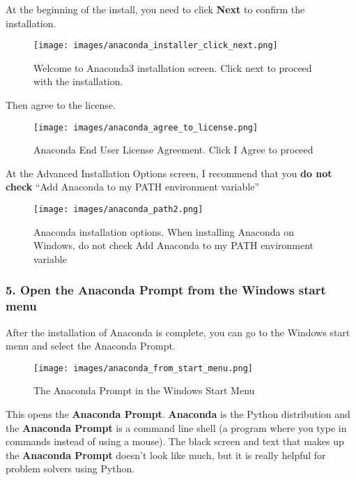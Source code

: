 \documentclass{book}
\makeatletter
\def\maxwidth{\ifdim\Gin@nat@width>\linewidth\linewidth
\else\Gin@nat@width\fi}
\let\Oldincludegraphics\includegraphics
\renewcommand{\includegraphics}[1]{\Oldincludegraphics[width=.8\maxwidth]{#1}}
\makeatother
\begin{document}
At the beginning of the install, you need to click \textbf{Next} to
confirm the installation.

\begin{figure}
\centering
\texttt{[image: images/anaconda\_installer\_click\_next.png]}
\caption{Welcome to Anaconda3 installation screen. Click next to proceed
with the installation.}
\end{figure}

Then agree to the license.

\begin{figure}
\centering
\texttt{[image: images/anaconda\_agree\_to\_license.png]}
\caption{Anaconda End User License Agreement. Click I Agree to proceed}
\end{figure}

At the Advanced Installation Options screen, I recommend that you
\textbf{do not check} ``Add Anaconda to my PATH environment variable''

\begin{figure}
\centering
\texttt{[image: images/anaconda\_path2.png]}
\caption{Anaconda installation options. When installing Anaconda on
Windows, do not check Add Anaconda to my PATH environment variable}
\end{figure}
    




    
        \hypertarget{open-the-anaconda-prompt-from-the-windows-start-menu}{%
\subsubsection{5. Open the Anaconda Prompt from the Windows start
menu}\label{open-the-anaconda-prompt-from-the-windows-start-menu}}

After the installation of Anaconda is complete, you can go to the
Windows start menu and select the Anaconda Prompt.

\begin{figure}
\centering
\texttt{[image: images/anaconda\_from\_start\_menu.png]}
\caption{The Anaconda Prompt in the Windows Start Menu}
\end{figure}

This opens the \textbf{Anaconda Prompt}. \textbf{Anaconda} is the Python
distribution and the \textbf{Anaconda Prompt} is a command line shell (a
program where you type in commands instead of using a mouse). The black
screen and text that makes up the \textbf{Anaconda Prompt} doesn't look
like much, but it is really helpful for problem solvers using Python.
\end{document}
